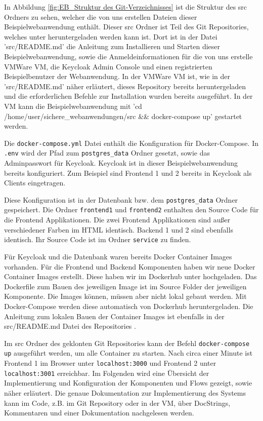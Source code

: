 In Abbildung \ref{fig:EB_Struktur des Git-Verzeichnisses} ist die Struktur des src Ordners zu sehen, welcher die von uns erstellen Dateien dieser Beispielwebanwendung enthält. Dieser src Ordner ist Teil des Git Repositories, welches unter \cite{SSEB1} heruntergeladen werden kann ist. Dort ist in der Datei 'src/README.md' \cite{SSEB2} die Anleitung zum Installieren und Starten dieser Beispielwebanwendung, sowie die Anmeldeinformationen für die von uns erstelle VMWare VM, die Keycloak Admin Console und einen registrierten Beispielbenutzer der Webanwendung. In der VMWare VM ist, wie in der 'src/README.md' näher erläutert, dieses Repository bereits heruntergeladen und die erforderlichen Befehle zur Installation wurden bereits ausgeführt. In der VM kann die Beispielwebanwendung mit 'cd /home/user/sichere\_webanwendungen/src \&\& docker-compose up' gestartet werden.

Die \texttt{docker-compose.yml} Datei enthält die Konfiguration für Docker-Compose. In \texttt{.env} wird der Pfad zum \texttt{postgres\_data} Ordner gesetzt, sowie das Adminpasswort für Keycloak. Keycloak ist in dieser Beispielwebanwendung bereits konfiguriert. Zum Beispiel sind Frontend 1 und 2 bereits in Keycloak als Clients eingetragen. 

Diese Konfiguration ist in der Datenbank bzw. dem \texttt{postgres\_data} Ordner gespeichert. Die Ordner \texttt{frontend1} und \texttt{frontend2} enthalten den Source Code für die Frontend Applikationen. Die zwei Frontend Applikationen sind außer verschiedener Farben im HTML identisch. Backend 1 und 2 sind ebenfalls identisch. Ihr Source Code ist im Ordner \texttt{service} zu finden.

Für Keycloak und die Datenbank waren bereits Docker Container Images vorhanden. Für die Frontend und Backend Komponenten haben wir neue Docker Container Images erstellt. Diese haben wir im Dockerhub unter \cite{EB42} hochgeladen. Das Dockerfile zum Bauen des jeweiligen Image ist im Source Folder der jeweiligen Komponente. Die Images können, müssen aber nicht lokal gebaut werden. Mit Docker-Compose werden diese automatisch von Dockerhub heruntergeladen. Die Anleitung zum lokalen Bauen der Container Images ist ebenfalls in der src/README.md Datei des Repositories \cite{SSEB2}.

Im src Ordner des geklonten Git Repositories \cite{SSEB1} kann der Befehl \texttt{docker-compose up} ausgeführt werden, um alle Container zu starten. Nach circa einer Minute ist Frontend 1 im Browser unter \texttt{localhost:3000} und Frontend 2 unter \texttt{localhost:3001} erreichbar. Im Folgenden wird eine Übersicht der Implementierung und Konfiguration der Komponenten und Flows gezeigt, sowie näher erläutert. Die genaue Dokumentation zur Implementierung des Systems kann im Code, z.B. im Git Repository \cite{SSEB1} oder in der VM, über DocStrings, Kommentaren und einer Dokumentation nachgelesen werden.


